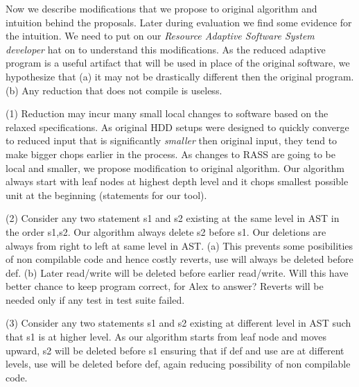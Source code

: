 Now we describe modifications that we propose to original algorithm and intuition behind the proposals. Later during evaluation we find some evidence for the intuition. We need to put on our \emph{Resource Adaptive Software System developer} hat on to understand this modifications. As the reduced adaptive program is a useful artifact that will be used in place of the original software, we hypothesize that (a) it may not be drastically different then the original program. (b) Any reduction that does not compile is useless.

(1)  Reduction may incur many small local changes to software based on the relaxed specifications. As original HDD setups were designed to quickly converge to reduced input that is significantly \emph{smaller} then original input, they tend to make bigger chops earlier in the process. As changes to RASS are going to be local and smaller, we propose modification to original algorithm. Our algorithm always start with leaf nodes at highest depth level and it chops smallest possible unit at the beginning (statements for our tool). 

(2) Consider any two statement s1 and s2 existing at the same level in AST in the order s1,s2. Our algorithm always delete s2 before s1. Our deletions are always from right to left at same level in AST. (a) This prevents some posibilities of non compilable code and hence costly reverts, use will always be deleted before def. (b) Later read/write will be deleted before earlier read/write. Will this have better chance to keep program correct, for Alex to answer? Reverts will be needed only if any test in test suite failed.    

(3) Consider any two statements s1 and s2 existing at different level in AST such that s1 is at higher level. As our algorithm starts from leaf node and moves upward, s2 will be deleted before s1 ensuring that if def and use are at different levels, use will be deleted before def, again reducing possibility of non compilable code.  

